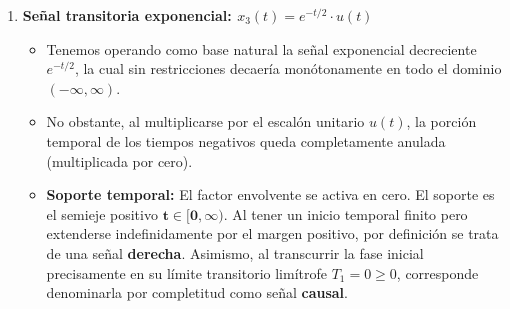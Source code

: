 \documentclass[10pt,a4paper]{article}
\begin{document}
\begin{enumerate}[label=\textbf{\alph*)}]
			Ejemplo de multiplicación causal de soporte:
			\begin{itemize}
			    \item La forma base es el coseno $\cos(\pi t)$, cuya frecuencia angular es $\omega = \pi$. Su período fundamental es $T = \frac{2\pi}{\omega} = 2$.
			    \item La función que recorta (ventana) es un pulso perimetral $p_2(t)$, centrado en el origen $t_0=0$ y con un ancho total $\tau=2$.
			    \item \textbf{Soporte temporal:} La onda cosenoidal base solo se graficará donde el pulso vale $1$. Estando el pulso en el origen y con largo 2, su soporte delimitador abarca explícitamente $\mathbf{t \in [-1, 1]}$. Tal particularidad nos exhibe una señal cuyo desarrollo descansa entre dos límites definidos, marcándola analíticamente de forma simultánea como \textbf{señal derecha} y \textbf{señal izquierda}. Dado que los eventos toman valores no nulos en la zona de tiempos negativos ($T_1 = -1 < 0$), se clasifica automáticamente como \textbf{no causal}.
			\end{itemize}
			Como el período del coseno es $2$, esta ventana aísla exactamente \textit{un único ciclo completo} de la función oscilatoria.
	
			\begin{figure}[H]
				\centering
				
				\caption{Gráfica de la onda de coseno base enventanada $x_2(t)$.}
			\end{figure}
	
			\item \textbf{Señal transitoria exponencial: $x_3(t) = e^{-t/2} \cdot u(t)$}
			
			\begin{itemize}
			    \item Tenemos operando como base natural la señal exponencial decreciente $e^{-t/2}$, la cual sin restricciones decaería monótonamente en todo el dominio $(-\infty, \infty)$.
			    \item No obstante, al multiplicarse por el escalón unitario $u(t)$, la porción temporal de los tiempos negativos queda completamente anulada (multiplicada por cero).
			    \item \textbf{Soporte temporal:} El factor envolvente se activa en cero. El soporte es el semieje positivo $\mathbf{t \in [0, \infty)}$. Al tener un inicio temporal finito pero extenderse indefinidamente por el margen positivo, por definición se trata de una señal \textbf{derecha}. Asimismo, al transcurrir la fase inicial precisamente en su límite transitorio limítrofe $T_1 = 0 \ge 0$, corresponde denominarla por completitud como señal \textbf{causal}.
			\end{itemize}
	

\end{enumerate}
\end{document}
